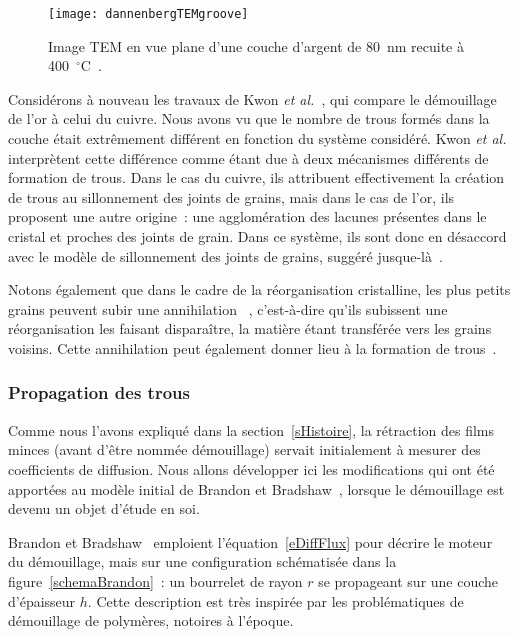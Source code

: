 \begin{figure}[!htb]
\centering
\texttt{[image: dannenbergTEMgroove]}
\caption{Image TEM en vue plane d'une couche d'argent de 80~nm recuite à 400~$^\circ$C~\cite{dannenberg2000situ}.}
\label{dannenbergTEMgroove}
\end{figure}
Considérons à nouveau les travaux de Kwon \textit{et al.}~\cite{kwon2003comparison}, qui compare le démouillage de l'or à celui du cuivre. Nous avons vu que le nombre de trous formés dans la couche était extrêmement différent en fonction du système considéré. Kwon \textit{et al.} interprètent cette différence comme étant due à deux mécanismes différents de formation de trous. Dans le cas du cuivre, ils attribuent effectivement la création de trous au sillonnement des joints de grains, mais dans le cas de l'or, ils proposent une autre origine~: une agglomération des lacunes présentes dans le cristal et proches des joints de grain. Dans ce système, ils sont donc en désaccord avec le modèle de sillonnement des joints de grains, suggéré jusque-là~\cite{frost1990simulation}.\par 
Notons également que dans le cadre de la réorganisation cristalline, les plus petits grains peuvent subir une \og annihilation \fg{}~\cite{frost1990simulation}, c'est-à-dire qu'ils subissent une réorganisation les faisant disparaître, la matière étant transférée vers les grains voisins. Cette annihilation peut également donner lieu à la formation de trous~\cite{derkach2014grain}.\par 



		\subsubsection{Propagation des trous}
Comme nous l'avons expliqué dans la section~\ref{sHistoire}, la rétraction des films minces (avant d'être nommée démouillage) servait initialement à mesurer des coefficients de diffusion. Nous allons développer ici les modifications qui ont été apportées au modèle initial de Brandon et Bradshaw~\cite{brandon1966mobility}, lorsque le démouillage est devenu un objet d'étude en soi.\par 
Brandon et Bradshaw~\cite{brandon1966mobility} emploient l'équation~\ref{eDiffFlux} pour décrire le moteur du démouillage, mais sur une configuration schématisée dans la figure~\ref{schemaBrandon}~: un bourrelet de rayon $r$ se propageant sur une couche d'épaisseur $h$. Cette description est très inspirée par les problématiques de démouillage de polymères, notoires à l'époque.\par 

